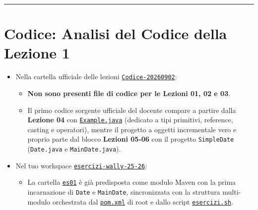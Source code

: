 \documentclass[11pt,a4paper,oneside]{report}
\newcommand{\passthrough}[1]{#1}
\providecommand{\tightlist}{\setlength{\itemsep}{0pt}\setlength{\parskip}{0pt}}
\begin{document}
\begin{center}\rule{0.5\linewidth}{0.5pt}\end{center}

\section{Codice: Analisi del Codice della Lezione
1}\label{chap01_codice-analisi-del-codice-della-lezione-1}

\begin{itemize}
\tightlist
\item
  Nella cartella ufficiale delle lezioni
  \href{file:///home/wally/Documenti/GitHub/Programmazione-II/25-26/Teoria-e-Esercitazioni/Codice-20260902}{\passthrough{\lstinline!Codice-20260902!}}:

  \begin{itemize}
  \tightlist
  \item
    \textbf{Non sono presenti file di codice per le Lezioni 01, 02 e
    03}.
  \item
    Il primo codice sorgente ufficiale del docente compare a partire
    dalla \textbf{Lezione 04} con
    \href{file:///home/wally/Documenti/GitHub/Programmazione-II/25-26/Teoria-e-Esercitazioni/Codice-20260902/Lezione04/Example.java}{\passthrough{\lstinline!Example.java!}}
    (dedicato a tipi primitivi, reference, casting e operatori), mentre
    il progetto a oggetti incrementale vero e proprio parte dal blocco
    \textbf{Lezioni 05-06} con il progetto
    \passthrough{\lstinline!SimpleDate!}
    (\passthrough{\lstinline!Date.java!} e
    \passthrough{\lstinline!MainDate.java!}).
  \end{itemize}
\item
  Nel tuo workspace
  \href{file:///home/wally/Documenti/GitHub/Programmazione-II/25-26/esercizi-wally-25-26}{\passthrough{\lstinline!esercizi-wally-25-26!}}:

  \begin{itemize}
  \tightlist
  \item
    La cartella
    \href{file:///home/wally/Documenti/GitHub/Programmazione-II/25-26/esercizi-wally-25-26/es01}{\passthrough{\lstinline!es01!}}
    è già predisposta come modulo Maven con la prima incarnazione di
    \passthrough{\lstinline!Date!} e \passthrough{\lstinline!MainDate!},
    sincronizzata con la struttura multi-modulo orchestrata dal
    \href{file:///home/wally/Documenti/GitHub/Programmazione-II/25-26/esercizi-wally-25-26/pom.xml}{\passthrough{\lstinline!pom.xml!}}
    di root e dallo script
    \href{file:///home/wally/Documenti/GitHub/Programmazione-II/25-26/esercizi-wally-25-26/esercizi.sh}{\passthrough{\lstinline!esercizi.sh!}}.
  \end{itemize}
\end{itemize}
\end{document}
